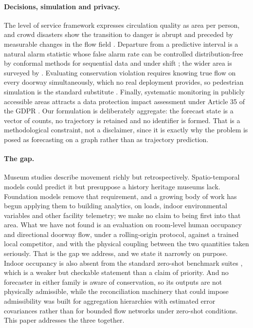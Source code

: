 \documentclass[11pt]{article}
\theoremstyle{plain}
\theoremstyle{definition}
\theoremstyle{remark}
\begin{document}
\paragraph{Decisions, simulation and privacy.}
The level of service framework \citep{fruin1971} expresses circulation quality as area per person, and crowd disasters show the transition to danger is abrupt and preceded by measurable changes in the flow field \citep{helbing2007crowd}. Departure from a predictive interval is a natural alarm statistic whose false alarm rate can be controlled distribution-free by conformal methods for sequential data \citep{stankeviciute2021conformal,xu2021enbpi} and under shift \citep{gibbs2021adaptive}; the wider area is surveyed by \citet{blazquez2021review}. Evaluating conservation violation requires knowing true flow on every doorway simultaneously, which no real deployment provides, so pedestrian simulation is the standard substitute \citep{helbing1995social,seitz2012osm,kleinmeier2019vadere,jupedsim}. Finally, systematic monitoring in publicly accessible areas attracts a data protection impact assessment under Article 35 of the GDPR \citep{gdpr}. Our formulation is deliberately aggregate: the forecast state is a vector of counts, no trajectory is retained and no identifier is formed. That is a methodological constraint, not a disclaimer, since it is exactly why the problem is posed as forecasting on a graph rather than as trajectory prediction.

\paragraph{The gap.}
Museum studies describe movement richly but retrospectively. Spatio-temporal models could predict it but presuppose a history heritage museums lack. Foundation models remove that requirement, and a growing body of work has begun applying them to building analytics, on loads, indoor environmental variables and other facility telemetry; we make no claim to being first into that area. What we have not found is an evaluation on room-level human occupancy and directional doorway flow, under a rolling-origin protocol, against a trained local competitor, and with the physical coupling between the two quantities taken seriously. That is the gap we address, and we state it narrowly on purpose. Indoor occupancy is also absent from the standard zero-shot benchmark suites \citep{aksu2024gifteval}, which is a weaker but checkable statement than a claim of priority. And no forecaster in either family is aware of conservation, so its outputs are not physically admissible, while the reconciliation machinery that could impose admissibility was built for aggregation hierarchies with estimated error covariances rather than for bounded flow networks under zero-shot conditions. This paper addresses the three together.
\end{document}
